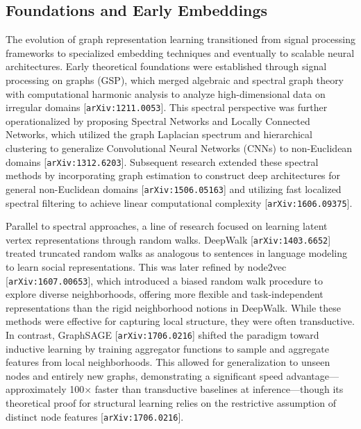 \documentclass[11pt]{article}
\begin{document}
\subsection{Foundations and Early Embeddings}

The evolution of graph representation learning transitioned from signal processing frameworks to specialized embedding techniques and eventually to scalable neural architectures. Early theoretical foundations were established through signal processing on graphs (GSP), which merged algebraic and spectral graph theory with computational harmonic analysis to analyze high-dimensional data on irregular domains [\texttt{arXiv:1211.0053}]. This spectral perspective was further operationalized by proposing Spectral Networks and Locally Connected Networks, which utilized the graph Laplacian spectrum and hierarchical clustering to generalize Convolutional Neural Networks (CNNs) to non-Euclidean domains [\texttt{arXiv:1312.6203}]. Subsequent research extended these spectral methods by incorporating graph estimation to construct deep architectures for general non-Euclidean domains [\texttt{arXiv:1506.05163}] and utilizing fast localized spectral filtering to achieve linear computational complexity [\texttt{arXiv:1606.09375}].

Parallel to spectral approaches, a line of research focused on learning latent vertex representations through random walks. DeepWalk [\texttt{arXiv:1403.6652}] treated truncated random walks as analogous to sentences in language modeling to learn social representations. This was later refined by node2vec [\texttt{arXiv:1607.00653}], which introduced a biased random walk procedure to explore diverse neighborhoods, offering more flexible and task-independent representations than the rigid neighborhood notions in DeepWalk. While these methods were effective for capturing local structure, they were often transductive. In contrast, GraphSAGE [\texttt{arXiv:1706.0216}] shifted the paradigm toward inductive learning by training aggregator functions to sample and aggregate features from local neighborhoods. This allowed for generalization to unseen nodes and entirely new graphs, demonstrating a significant speed advantage—approximately 100× faster than transductive baselines at inference—though its theoretical proof for structural learning relies on the restrictive assumption of distinct node features [\texttt{arXiv:1706.0216}].
\end{document}
